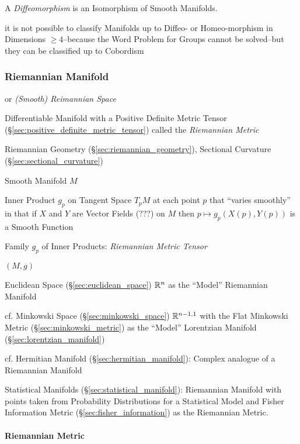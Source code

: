 A \emph{Diffeomorphism} is an Isomorphism of Smooth Manifolds.

it is not possible to classify Manifolds up to Diffeo- or Homeo-morphism in
Dimensions $\geq 4$--because the Word Problem for Groups cannot be solved--but
they can be classified up to Cobordism




\subsubsection{Riemannian Manifold}\label{sec:riemannian_manifold}


or \emph{(Smooth) Reimannian Space}

Differentiable Manifold with a Positive Definite Metric Tensor
(\S\ref{sec:positive_definite_metric_tensor}) called the
\emph{Riemannian Metric}

Riemannian Geometry (\S\ref{sec:riemannian_geometry}), Sectional Curvature
(\S\ref{sec:sectional_curvature})

Smooth Manifold $M$

Inner Product $g_p$ on Tangent Space $T_pM$ at each point $p$ that
``varies smoothly'' in that if $X$ and $Y$ are Vector Fields (???) on
$M$ then $p \mapsto g_p(X(p),Y(p))$ is a Smooth Function %

Family $g_p$ of Inner Products: \emph{Riemannian Metric Tensor}

$(M,g)$

Euclidean Space (\S\ref{sec:euclidean_space}) $\mathbb{R}^n$ as the
``Model'' Riemannian Manifold

cf. Minkowski Space (\S\ref{sec:minkowski_space}) $\mathbb{R}^{n-1,1}$
with the Flat Minkowski Metric (\S\ref{sec:minkowski_metric}) as the
``Model'' Lorentzian Manifold (\S\ref{sec:lorentzian_manifold})

cf. Hermitian Manifold (\S\ref{sec:hermitian_manifold}): Complex
analogue of a Riemannian Manifold

\fist Statistical Manifolds (\S\ref{sec:statistical_manifold}):
Riemannian Manifold with points taken from Probability Distributions
for a Statistical Model and Fisher Information Metric
(\S\ref{sec:fisher_information}) as the Riemannian Metric.



\paragraph{Riemannian Metric}\label{sec:riemannian_metric}\hfill

